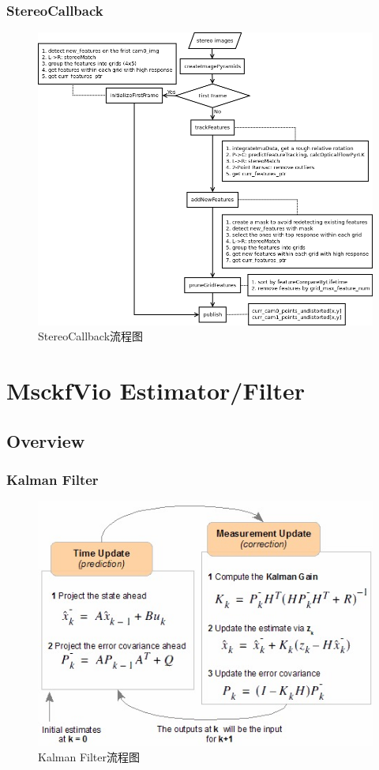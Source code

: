 \documentclass[12pt,a4paper]{article}
\begin{document}
\subsubsection{StereoCallback}

\begin{figure}[!htbp]
\centering
\includegraphics[scale=0.6]{images/stereo_cb.png}
\caption{StereoCallback流程图}
\end{figure}


\newpage
\section{MsckfVio Estimator/Filter}

\subsection{Overview}

\subsubsection{Kalman Filter}

\begin{figure}[!htbp]
\centering
\includegraphics[scale=0.7]{images/kf_flow.jpg}
\caption{Kalman Filter流程图}
\end{figure}
\end{document}
